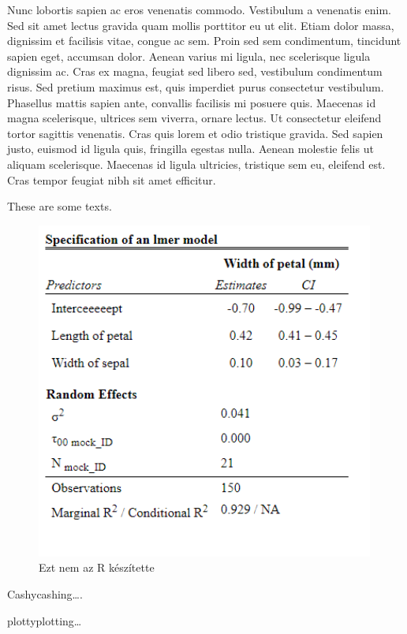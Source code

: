 \documentclass[]{elsarticle} %
\begin{document}
Nunc lobortis sapien ac eros venenatis commodo. Vestibulum a venenatis
enim. Sed sit amet lectus gravida quam mollis porttitor eu ut elit.
Etiam dolor massa, dignissim et facilisis vitae, congue ac sem. Proin
sed sem condimentum, tincidunt sapien eget, accumsan dolor. Aenean
varius mi ligula, nec scelerisque ligula dignissim ac. Cras ex magna,
feugiat sed libero sed, vestibulum condimentum risus. Sed pretium
maximus est, quis imperdiet purus consectetur vestibulum. Phasellus
mattis sapien ante, convallis facilisis mi posuere quis. Maecenas id
magna scelerisque, ultrices sem viverra, ornare lectus. Ut consectetur
eleifend tortor sagittis venenatis. Cras quis lorem et odio tristique
gravida. Sed sapien justo, euismod id ligula quis, fringilla egestas
nulla. Aenean molestie felis ut aliquam scelerisque. Maecenas id ligula
ultricies, tristique sem eu, eleifend est. Cras tempor feugiat nibh sit
amet efficitur.

These are some texts.

\begin{figure}[H]
\includegraphics[width = 30em]{figure/webshot.png}
\centering
\caption{Ezt nem az R készítette}
\label{fig:webshot_sjPlot}
\end{figure}

Cashycashing\ldots.

plottyplotting\ldots{}
\end{document}

